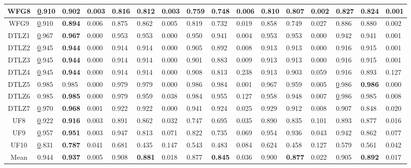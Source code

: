 \begin{table*}[t]
\begin{scriptsize}
\begin{tabular}{c l|l|l|l|l|l|l|l|l|l|l|l|l|l|l}
\multicolumn{1}{c|}{WFG8} & {\ul 0.910} & \textbf{0.902} & 0.003 & 0.816 & 0.812 & 0.003 & 0.759 & 0.748 & 0.006 & 0.810 & 0.807 & 0.002 & 0.827 & 0.824 & 0.001 \\ \hline
\multicolumn{1}{c|}{WFG9} & {\ul 0.910} & \textbf{0.894} & 0.006 & 0.875 & 0.862 & 0.005 & 0.819 & 0.732 & 0.019 & 0.858 & 0.749 & 0.027 & 0.886 & 0.880 & 0.002 \\ \hline
\multicolumn{1}{c|}{DTLZ1} & {\ul 0.967} & \textbf{0.967} & 0.000 & 0.953 & 0.953 & 0.000 & 0.950 & 0.941 & 0.004 & 0.953 & 0.953 & 0.000 & 0.942 & 0.941 & 0.001 \\ \hline
\multicolumn{1}{c|}{DTLZ2} & {\ul 0.945} & \textbf{0.944} & 0.000 & 0.914 & 0.914 & 0.000 & 0.905 & 0.892 & 0.008 & 0.913 & 0.913 & 0.000 & 0.916 & 0.915 & 0.001 \\ \hline
\multicolumn{1}{c|}{DTLZ3} & {\ul 0.945} & \textbf{0.944} & 0.000 & 0.914 & 0.914 & 0.000 & 0.901 & 0.883 & 0.009 & 0.913 & 0.913 & 0.000 & 0.916 & 0.915 & 0.001 \\ \hline
\multicolumn{1}{c|}{DTLZ4} & {\ul 0.945} & \textbf{0.944} & 0.000 & 0.914 & 0.914 & 0.000 & 0.908 & 0.813 & 0.238 & 0.913 & 0.903 & 0.059 & 0.916 & 0.893 & 0.127 \\ \hline
\multicolumn{1}{c|}{DTLZ5} & 0.985 & 0.985 & 0.000 & 0.979 & 0.979 & 0.000 & 0.986 & 0.984 & 0.001 & 0.967 & 0.959 & 0.005 & {\ul 0.986} & \textbf{0.986} & 0.000 \\ \hline
\multicolumn{1}{c|}{DTLZ6} & 0.985 & \textbf{0.985} & 0.000 & 0.979 & 0.959 & 0.038 & 0.984 & 0.955 & 0.127 & 0.958 & 0.948 & 0.007 & {\ul 0.986} & 0.985 & 0.008 \\ \hline
\multicolumn{1}{c|}{DTLZ7} & {\ul 0.970} & \textbf{0.968} & 0.001 & 0.922 & 0.922 & 0.000 & 0.941 & 0.924 & 0.025 & 0.929 & 0.912 & 0.008 & 0.907 & 0.848 & 0.020 \\ \hline
\multicolumn{1}{c|}{UF8} & {\ul 0.922} & \textbf{0.916} & 0.003 & 0.891 & 0.862 & 0.032 & 0.747 & 0.695 & 0.035 & 0.890 & 0.835 & 0.101 & 0.893 & 0.877 & 0.016 \\ \hline
\multicolumn{1}{c|}{UF9} & {\ul 0.957} & \textbf{0.951} & 0.003 & 0.947 & 0.813 & 0.071 & 0.822 & 0.735 & 0.069 & 0.954 & 0.936 & 0.043 & 0.942 & 0.862 & 0.077 \\ \hline
\multicolumn{1}{c|}{UF10} & {\ul 0.831} & \textbf{0.787} & 0.041 & 0.681 & 0.435 & 0.147 & 0.543 & 0.483 & 0.084 & 0.624 & 0.458 & 0.127 & 0.579 & 0.561 & 0.042 \\ \hline
\multicolumn{1}{c|}{Mean} & 0.944 & \textbf{0.937} & 0.005 & 0.908 & \textbf{0.881} & 0.018 & 0.877 & \textbf{0.845} & 0.036 & 0.900 & \textbf{0.877} & 0.022 & 0.905 & \textbf{0.892} & 0.017 \\ \hline
\end{tabular}%
\end{scriptsize}
\end{table*}

